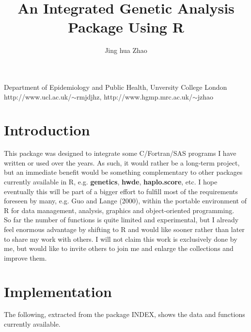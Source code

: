 \documentclass[10pt,a4paper]{article}
\begin{document}
\title{An Integrated Genetic Analysis Package Using R}

\author{Jing hua Zhao}
\date{}
\maketitle

\begin{center}
Department of Epidemiology and Public Health, Unversity College London\\
http://www.ucl.ac.uk/$\sim$rmjdjhz, http://www.hgmp.mrc.ac.uk/$\sim$jzhao
\end{center}

\tableofcontents



\section{Introduction}

This package was designed to integrate some C/Fortran/SAS programs I have written 
or used over the years. As such, it would rather be a long-term project, but an
immediate benefit would be something complementary to other packages currently
available in R, e.g. {\bf genetics}, {\bf hwde}, {\bf haplo.score}, etc. I hope
eventually this will be part of a bigger effort to fulfill most of the requirements
foreseen by many, e.g. Guo and Lange (2000), within the portable environment of R
for data management, analysis, graphics and object-oriented programming. \\

So far the number of functions is quite limited and experimental, but I already
feel enormous advantage by shifting to R and would like sooner rather than later
to share my work with others. I will not claim this work is exclusively done by
me, but would like to invite others to join me and enlarge the collections and
improve them.


\section{Implementation}

The following, extracted from the package INDEX, shows the data and functions
currently available.
\end{document}
